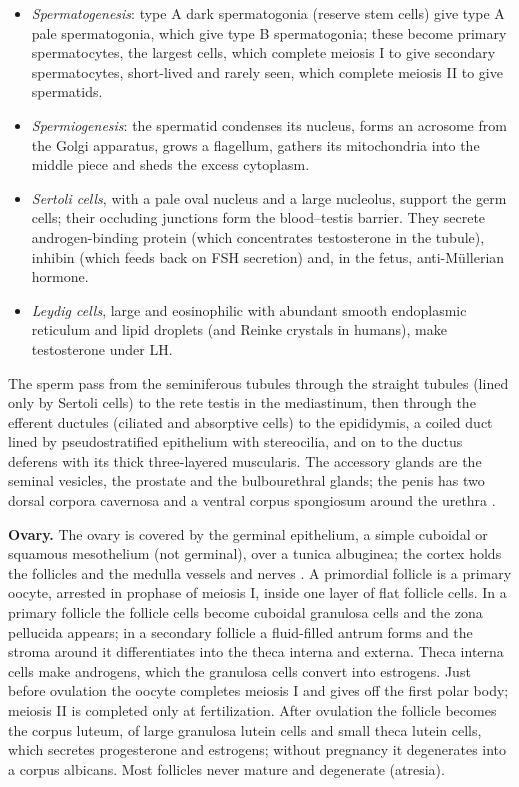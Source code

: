 \begin{itemize}
\item \emph{Spermatogenesis}: type A dark
spermatogonia (reserve stem cells) give type
A pale spermatogonia, which give type B
spermatogonia; these become primary
spermatocytes, the largest cells, which
complete meiosis I to give secondary
spermatocytes, short-lived and rarely seen,
which complete meiosis II to give spermatids.
\item \emph{Spermiogenesis}: the spermatid
condenses its nucleus, forms an acrosome from
the Golgi apparatus, grows a flagellum,
gathers its mitochondria into the middle
piece and sheds the excess cytoplasm.
\item \emph{Sertoli cells}, with a pale oval
nucleus and a large nucleolus, support the
germ cells; their occluding junctions form
the blood--testis barrier. They secrete
androgen-binding protein (which concentrates
testosterone in the tubule), inhibin (which
feeds back on FSH secretion) and, in the
fetus, anti-M\"ullerian hormone.
\item \emph{Leydig cells}, large and
eosinophilic with abundant smooth endoplasmic
reticulum and lipid droplets (and Reinke
crystals in humans), make testosterone under
LH.
\end{itemize}

The sperm pass from the seminiferous tubules
through the straight tubules (lined only by
Sertoli cells) to the rete testis in the
mediastinum, then through the efferent
ductules (ciliated and absorptive cells) to
the epididymis, a coiled duct lined by
pseudostratified epithelium with stereocilia,
and on to the ductus deferens with its thick
three-layered muscularis. The accessory
glands are the seminal vesicles, the prostate
and the bulbourethral glands; the penis has
two dorsal corpora cavernosa and a ventral
corpus spongiosum around the urethra
\cite[Chapter 22]{ross2011histology}.

\textbf{Ovary.} The ovary is covered by the
germinal epithelium, a simple cuboidal or
squamous mesothelium (not germinal), over a
tunica albuginea; the cortex holds the
follicles and the medulla vessels and nerves
\cite[Chapter 23]{ross2011histology}. A
primordial follicle is a primary oocyte,
arrested in prophase of meiosis I, inside one
layer of flat follicle cells. In a primary
follicle the follicle cells become cuboidal
granulosa cells and the zona pellucida
appears; in a secondary follicle a
fluid-filled antrum forms and the stroma
around it differentiates into the theca
interna and externa. Theca interna cells make
androgens, which the granulosa cells convert
into estrogens. Just before ovulation the
oocyte completes meiosis I and gives off the
first polar body; meiosis II is completed
only at fertilization. After ovulation the
follicle becomes the corpus luteum, of large
granulosa lutein cells and small theca lutein
cells, which secretes progesterone and
estrogens; without pregnancy it degenerates
into a corpus albicans. Most follicles never
mature and degenerate (atresia).

